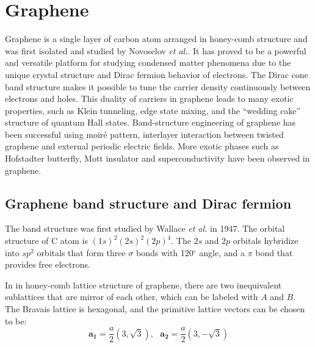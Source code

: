 \documentclass[pdflatex, sectionletters, 12pt]{pittetd}    %
\begin{document}
\section{Graphene}

Graphene is a single layer of carbon atom arranged in honey-comb structure and was first isolated and studied by Novoselov \textit{et al.}\cite{novoselov2004electric}. It has proved to be a powerful and versatile platform for studying condensed matter phenomena due to the unique crystal structure and Dirac fermion behavior of electrons\cite{wilson2006electrons}. The Dirac cone band structure makes it possible to tune the carrier density continuously between electrons and holes. This duality of carriers in graphene leads to many exotic properties, such as Klein tunneling\cite{allain2011klein, katsnelson2006chiral, young2009quantum, shytov2008klein}, edge state mixing\cite{williams2007quantum, abanin2007quantized, lohmann2009four, amet2014selective}, and the ``wedding cake'' structure of quantum Hall states\cite{gutierrez2018interaction}. Band-structure engineering of graphene has been successful using moir{\'e} pattern\cite{dean2013hofstadter, hunt2013massive, ponomarenko2013cloing}, interlayer interaction between twisted graphene\cite{cao2018correlated, cao2018unconventional} and external periodic electric fields\cite{forsythe2018band}. More exotic phases such as Hofstadter butterfly\cite{dean2013hofstadter, hunt2013massive, forsythe2018band}, Mott insulator\cite{cao2018correlated} and superconductivity\cite{cao2018unconventional} have been observed in graphene.

\subsection{Graphene band structure and Dirac fermion}

The band structure was first studied by Wallace \textit{et al.} in 1947\cite{wallace1947band}. The orbital structure of C atom is $(1s)^2(2s)^2(2p)^4$. The $2s$ and $2p$ orbitals hybridize into $sp^2$ orbitals that form three $\sigma$ bonds with 120$^{\circ}$ angle, and a $\pi$ bond that provides free electrons. 

In in honey-comb lattice structure of graphene, there are two inequivalent sublattices that are mirror of each other, which can be labeled with $A$ and $B$. The Bravais lattice is hexagonal, and the primitive lattice vectors can be chosen to be: 
$$\mathbf{a_1} = \frac{a}{2}\left(3, \sqrt{3}\right), \ \ \ \mathbf{a_2} = \frac{a}{2}\left(3, -\sqrt{3}\right)$$
\end{document}
